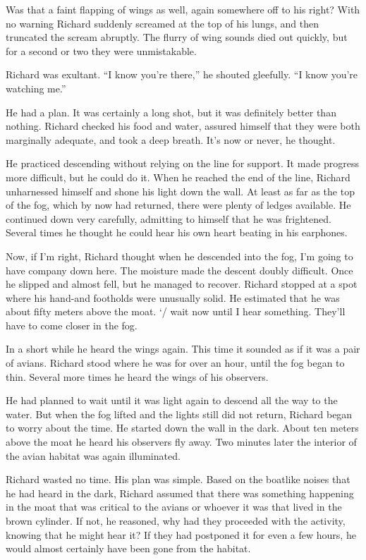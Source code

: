 \documentclass[]{article}
\begin{document}
{Was that a faint flapping of wings as well, again somewhere off to his right? With no warning Richard suddenly screamed at the top of his lungs, and then truncated the scream abruptly.  The flurry of wing sounds died out quickly, but for a second or two they were unmistakable.

Richard was exultant.  “I know you’re there,” he shouted gleefully.  “I know you’re watching me.”

He had a plan.  It was certainly a long shot, but it was definitely better than nothing.  Richard checked his food and water, assured himself that they were both marginally adequate, and took a deep breath.  It’s now or never, he thought.

He practiced descending without relying on the line for support.  It made progress more difficult, but he could do it.  When he reached the end of the line, Richard unharnessed himself and shone his light down the wall.  At least as far as the top of the fog, which by now had returned, there were plenty of ledges available.  He continued down very carefully, admitting to himself that he was frightened.  Several times he thought he could hear his own heart beating in his earphones.

Now, if I’m right, Richard thought when he descended into the fog, I’m going to have company down here.  The moisture made the descent doubly difficult.  Once he slipped and almost fell, but he managed to recover.  Richard stopped at a spot where his hand-and footholds were unusually solid.  He estimated that he was about fifty meters above the moat.  ‘/ wait now until I hear something.  They’ll have to come closer in the fog.

In a short while he heard the wings again.  This time it sounded as if it was a pair of avians.  Richard stood where he was for over an hour, until the fog began to thin.  Several more times he heard the wings of his observers.

He had planned to wait until it was light again to descend all the way to the water.  But when the fog lifted and the lights still did not return, Richard began to worry about the time.  He started down the wall in the dark.  About ten meters above the moat he heard his observers fly away.  Two minutes later the interior of the avian habitat was again illuminated.

Richard wasted no time.  His plan was simple.  Based on the boatlike noises that he had heard in the dark, Richard assumed that there was something happening in the moat that was critical to the avians or whoever it was that lived in the brown cylinder.  If not, he reasoned, why had they proceeded with the activity, knowing that he might hear it? If they had postponed it for even a few hours, he would almost certainly have been gone from the habitat.

}
\end{document}
